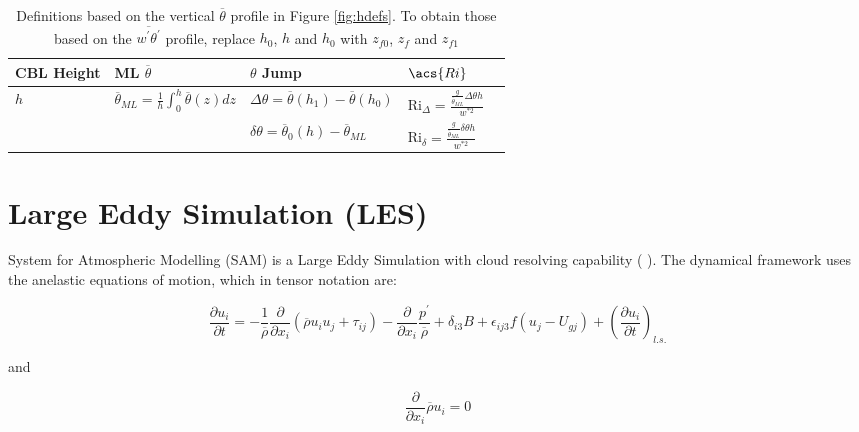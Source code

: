 \begin{table}[htbp]
\caption[Height definitions]{Definitions based on the vertical $\overline{\theta}$ profile in Figure \ref{fig:hdefs}.  To obtain those based on the $\overline{w^{'}\theta^{'}}$ profile, replace $h_{0}$, $h$ and $h_{0}$ with $z_{f0}$, $z_{f}$ and $z_{f1}$}
    \begin{center}
    \begin{tabular}{ p{1.2cm} p{3.3cm}  p{3.2cm}  p{3cm} p{2.5cm} }
      \acs{CBL} Height & \acs{ML} $\overline{\theta}$ & $\theta$ Jump &$\acs{Ri}$\\ \hline 
       $h$ & $\overline{\theta}_{ML} = \frac{1}{h}\int^{h}_{0}\overline{\theta}(z)dz$ & $\Delta \theta=\overline{\theta}(h_{1})-\overline{\theta}(h_{0})$ & \acs{Ri}$_{\Delta}=\frac{\frac{g}{\overline{\theta}_{ML}}\Delta \theta h}{w^{*2}}$  \\ [.3cm] %
        
       & &$\delta \theta = \overline{\theta}_{0}(h)- \overline{\theta}_{ML}$ & \acs{Ri}$_{\delta}=\frac{\frac{g}{\overline{\theta}_{ML}} \delta \theta h}{w^{*2}}$ \\ \hline
      \end{tabular}
\label{tab:reldefs}   
\end{center}    
\end{table}

\section{Large Eddy Simulation (\acs{LES})}
\label{sec:LargeEddieSimulation}

System for Atmospheric Modelling (SAM) is a Large Eddy Simulation with cloud resolving capability (\citeauthor{KhairRand} \citeyear{KhairRand}). The dynamical framework uses the anelastic equations of motion, which in tensor notation are:

\begin{equation}
\frac{\partial u_{i}}{\partial t} = -\frac{1}{\overline{\rho}}\frac{\partial}{\partial x_{i}}(\overline{\rho}u_{i}u_{j} + \tau_{ij}) - \frac{\partial}{\partial x_{i}}\frac{p^{'}}{\overline{\rho}} + \delta_{i3}B + \epsilon_{ij3}f(u_{j} - U_{gj}) + \left( \frac{\partial u_{i}}{\partial t} \right)_{l.s.}
\end{equation}

and

\begin{equation}
\frac{\partial}{\partial x_{i}}\overline{\rho}u_{i}=0
\end{equation}


